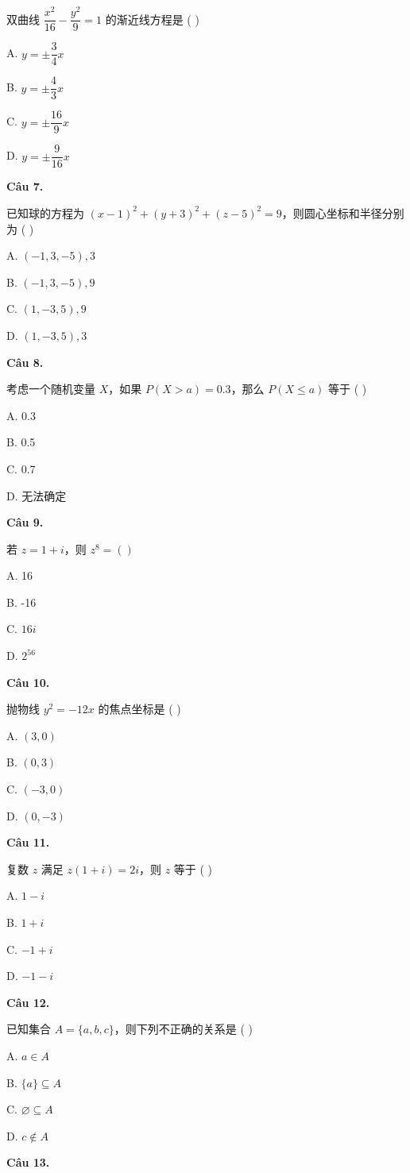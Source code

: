 \documentclass[11pt, a4paper]{article}
\begin{document}
双曲线 $\dfrac{x^2}{16} - \dfrac{y^2}{9} = 1$ 的渐近线方程是 ( )

A. $y = \pm\dfrac{3}{4}x$

B. $y = \pm\dfrac{4}{3}x$

C. $y = \pm\dfrac{16}{9}x$

D. $y = \pm\dfrac{9}{16}x$

\textbf{Câu 7.}

已知球的方程为 $(x-1)^2 + (y+3)^2 + (z-5)^2 = 9$，则圆心坐标和半径分别为 ( )

A. $(-1, 3, -5), 3$

B. $(-1, 3, -5), 9$

C. $(1, -3, 5), 9$

D. $(1, -3, 5), 3$

\textbf{Câu 8.}

考虑一个随机变量 $X$，如果 $P(X > a) = 0.3$，那么 $P(X \le a)$ 等于 ( )

A. 0.3

B. 0.5

C. 0.7

D. 无法确定

\textbf{Câu 9.}

若 $z = 1 + i$，则 $z^8 = ( )$

A. 16

B. -16

C. $16i$

D. $2^{56}$

\textbf{Câu 10.}

抛物线 $y^2 = -12x$ 的焦点坐标是 ( )

A. $(3, 0)$

B. $(0, 3)$

C. $(-3, 0)$

D. $(0, -3)$

\textbf{Câu 11.}

复数 $z$ 满足 $z(1 + i) = 2i$，则 $z$ 等于 ( )

A. $1 - i$

B. $1 + i$

C. $-1 + i$

D. $-1 - i$

\textbf{Câu 12.}

已知集合 $A = \{a, b, c\}$，则下列不正确的关系是 ( )

A. $a \in A$

B. $\{a\} \subseteq A$

C. $\varnothing \subseteq A$

D. $c \notin A$

\textbf{Câu 13.}
\end{document}
